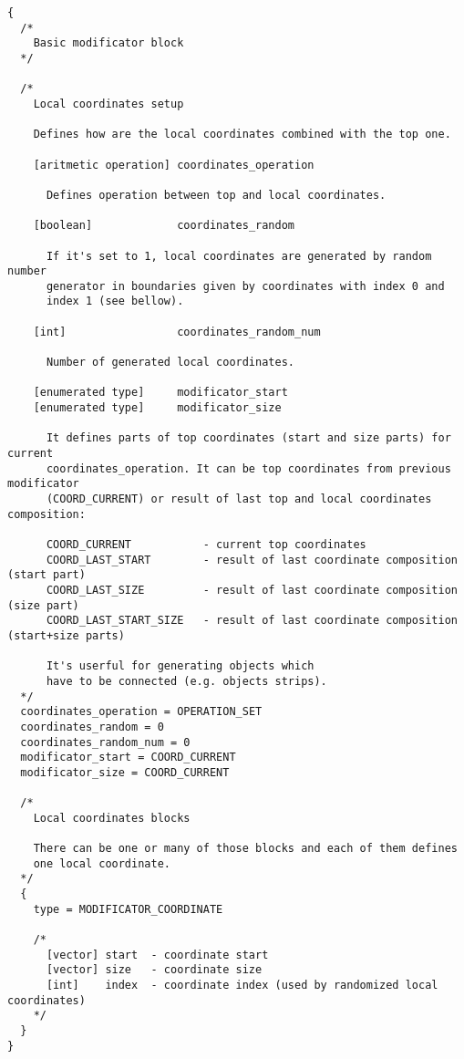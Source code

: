 \documentclass[9pt]{article}
\begin{document}
\begin{verbatim}
{
  /*
    Basic modificator block
  */

  /*
    Local coordinates setup
    
    Defines how are the local coordinates combined with the top one.
  
    [aritmetic operation] coordinates_operation 
    
      Defines operation between top and local coordinates.
    
    [boolean]             coordinates_random
    
      If it's set to 1, local coordinates are generated by random number
      generator in boundaries given by coordinates with index 0 and 
      index 1 (see bellow).
      
    [int]                 coordinates_random_num
    
      Number of generated local coordinates.
    
    [enumerated type]     modificator_start
    [enumerated type]     modificator_size
      
      It defines parts of top coordinates (start and size parts) for current 
      coordinates_operation. It can be top coordinates from previous modificator 
      (COORD_CURRENT) or result of last top and local coordinates composition:
      
      COORD_CURRENT           - current top coordinates
      COORD_LAST_START        - result of last coordinate composition (start part)
      COORD_LAST_SIZE         - result of last coordinate composition (size part)
      COORD_LAST_START_SIZE   - result of last coordinate composition (start+size parts)
      
      It's userful for generating objects which 
      have to be connected (e.g. objects strips).
  */  
  coordinates_operation = OPERATION_SET
  coordinates_random = 0
  coordinates_random_num = 0
  modificator_start = COORD_CURRENT
  modificator_size = COORD_CURRENT
  
  /*
    Local coordinates blocks
    
    There can be one or many of those blocks and each of them defines
    one local coordinate.
  */
  {
    type = MODIFICATOR_COORDINATE
    
    /*
      [vector] start  - coordinate start
      [vector] size   - coordinate size
      [int]    index  - coordinate index (used by randomized local coordinates)
    */
  }
}
\end{verbatim}
\end{document}
